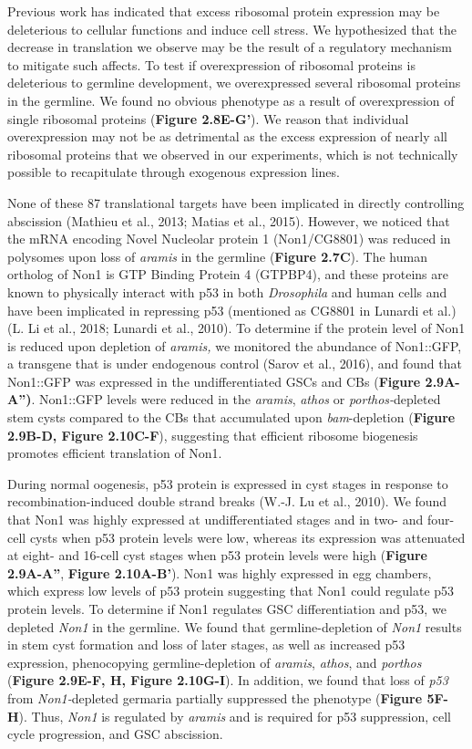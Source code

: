 \documentclass[12pt,oneside]{reedthesis}
\begin{document}
Previous work has indicated that excess ribosomal protein expression may
be deleterious to cellular functions and induce cell stress. We
hypothesized that the decrease in translation we observe may be the
result of a regulatory mechanism to mitigate such affects. To test if
overexpression of ribosomal proteins is deleterious to germline
development, we overexpressed several ribosomal proteins in the
germline. We found no obvious phenotype as a result of overexpression of
single ribosomal proteins (\textbf{Figure 2.8E-G'}). We reason that individual
overexpression may not be as detrimental as the excess expression of
nearly all ribosomal proteins that we observed in our experiments, which
is not technically possible to recapitulate through exogenous expression
lines.

None of these 87 translational targets have been implicated in directly
controlling abscission (Mathieu et al., 2013; Matias et al., 2015). However, we
noticed that the mRNA encoding Novel Nucleolar protein 1 (Non1/CG8801)
was reduced in polysomes upon loss of \emph{aramis} in the germline (\textbf{Figure 2.7C}).
The human ortholog of Non1 is GTP Binding Protein 4 (GTPBP4), and
these proteins are known to physically interact with p53 in both
\emph{Drosophila} and human cells and have been implicated in repressing p53
(mentioned as CG8801 in Lunardi et al.) (L. Li et al., 2018; Lunardi et al., 2010).
To determine if the protein level of Non1 is reduced upon depletion of
\emph{aramis,} we monitored the abundance of Non1::GFP, a transgene that is
under endogenous control (Sarov et al., 2016), and
found that Non1::GFP was expressed in the undifferentiated GSCs and CBs
(\textbf{Figure 2.9A-A'')}. Non1::GFP levels were reduced in the \emph{aramis},
\emph{athos} or \emph{porthos-}depleted stem cysts compared to the CBs that
accumulated upon \emph{bam}-depletion (\textbf{Figure 2.9B-D, Figure 2.10C-F}),
suggesting that efficient ribosome biogenesis promotes efficient
translation of Non1.

During normal oogenesis, p53 protein is expressed in cyst stages in
response to recombination-induced double strand breaks
(W.-J. Lu et al., 2010). We found that Non1 was highly
expressed at undifferentiated stages and in two- and four-cell cysts
when p53 protein levels were low, whereas its expression was attenuated
at eight- and 16-cell cyst stages when p53 protein levels were high
(\textbf{Figure 2.9A-A''}, \textbf{Figure 2.10A-B'}). Non1 was highly expressed in egg
chambers, which express low levels of p53 protein suggesting that Non1
could regulate p53 protein levels. To determine if Non1 regulates GSC
differentiation and p53, we depleted \emph{Non1} in the germline. We found
that germline-depletion of \emph{Non1} results in stem cyst formation and
loss of later stages, as well as increased p53 expression, phenocopying
germline-depletion of \emph{aramis}, \emph{athos}, and \emph{porthos} (\textbf{Figure 2.9E-F, H, Figure 2.10G-I}). In addition, we found that loss of \emph{p53} from
\emph{Non1-}depleted germaria partially suppressed the phenotype (\textbf{Figure
5F-H}). Thus, \emph{Non1} is regulated by \emph{aramis} and is required for p53
suppression, cell cycle progression, and GSC abscission.
\end{document}
